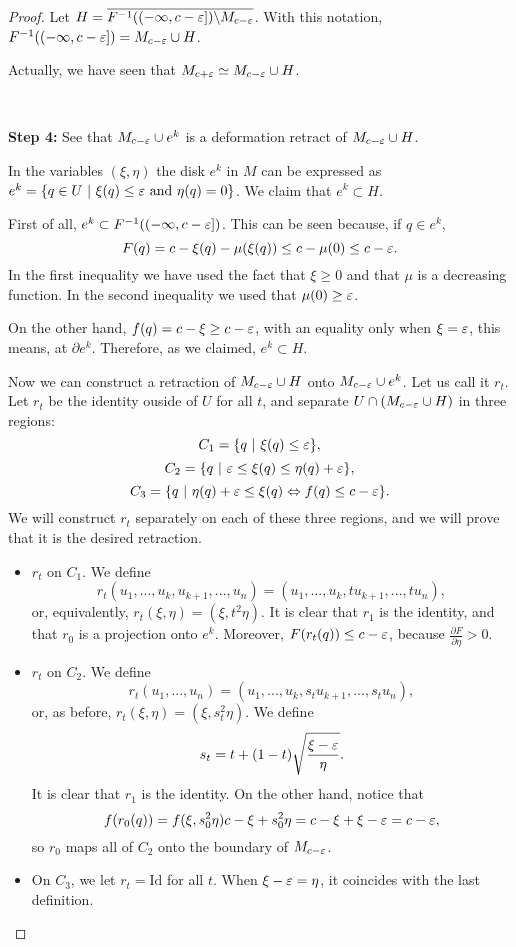 \begin{proof}
Let $H = \overline{F^{-1}((-\infty,c-\varepsilon]) \backslash M_{c-\varepsilon}}$. With this notation, $F^{-1}((-\infty,c-\varepsilon]) = M_{c-\varepsilon} \cup H$.

Actually, we have seen that $M_{c+\varepsilon} \simeq M_{c-\varepsilon} \cup H$.

\

{\bf Step 4:} See that $M_{c-\varepsilon} \cup e^k$ is a deformation retract of $M_{c-\varepsilon} \cup H$.

In the variables $(\xi, \eta)$ the disk $e^k$ in $M$ can be expressed as $e^k = \{q \in U \ | \ \xi(q) \leq \e \text{ and } \eta(q) = 0\}$. We claim that $e^k \subset H$.

First of all, $e^k \subset F^{-1}((-\infty,c-\varepsilon])$. This can be seen because, if $q \in e^k$,
$$F(q) = c -\xi(q) - \mu(\xi(q)) \leq c - \mu(0) \leq c - \varepsilon .$$
In the first inequality we have used the fact that $\xi \geq 0$ and that $\mu$ is a decreasing function. In the second inequality we used that $\mu(0) \geq \varepsilon$.

On the other hand, $f(q) = c - \xi \geq c - \varepsilon$, with an equality only when $\xi = \varepsilon$, this means, at $\partial e^k$. Therefore, as we claimed, $e^k \subset H$.

Now we can construct a retraction of $M_{c-\varepsilon} \cup H$ onto $M_{c-\varepsilon} \cup e^k$. Let us call it $r_t$. Let $r_t$ be the identity ouside of $U$ for all $t$, and separate $U \cap \left( M_{c-\varepsilon} \cup H \right)$ in three regions:
$$C_1 = \{ q \ | \ \xi(q) \leq \varepsilon \} ,$$
$$C_2 = \{ q \ | \ \varepsilon \leq \xi(q) \leq \eta(q) + \varepsilon \} ,$$
$$C_3 = \{ q \ | \ \eta(q) + \varepsilon \leq \xi(q) \Leftrightarrow f(q) \leq c - \varepsilon \} .$$
We will construct $r_t$ separately on each of these three regions, and we will prove that it is the desired retraction.

\begin{itemize}
	\item $r_t$ on $C_1$. We define
	$$r_t(u_1,...,u_k,u_{k+1},...,u_n) = (u_1,...,u_k,tu_{k+1},...,tu_n) ,$$
	or, equivalently, $r_t(\xi,\eta) = (\xi,t^2\eta)$. It is clear that $r_1$ is the identity, and that $r_0$ is a projection onto $e^k$. Moreover, $F(r_t(q)) \leq c - \varepsilon$, because $\frac{\partial F}{\partial \eta} > 0$.
	\item $r_t$ on $C_2$. We define
	$$r_t(u_1,...,u_n) = (u_1,...,u_k,s_tu_{k+1},...,s_tu_n) ,$$
	or, as before, $r_t(\xi,\eta) = (\xi, s_t^2 \eta)$. We define
	$$s_t = t + (1-t) \sqrt{\frac{\xi-\varepsilon}{\eta}} .$$
	It is clear that $r_1$ is the identity. On the other hand, notice that
	$$f(r_0(q)) = f(\xi,s_0^2\eta) c - \xi + s_0^2 \eta = c - \xi + \xi - \varepsilon = c -\varepsilon,$$
	so $r_0$ maps all of $C_2$ onto the boundary of $M_{c-\varepsilon}$.
	\item On $C_3$, we let $r_t = \text{Id}$ for all $t$. When $\xi - \varepsilon = \eta$, it coincides with the last definition.
\end{itemize}


\end{proof}
